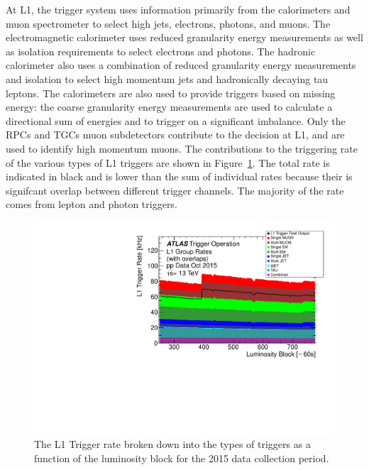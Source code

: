 At L1, the trigger system uses information primarily from the calorimeters and muon spectrometer to select high \pt jets, electrons, photons, and muons. 
The electromagnetic calorimeter uses reduced granularity energy measurements as well as isolation requirements to select electrons and photons.
The hadronic calorimeter also uses a combination of reduced granularity energy measurements and isolation to select high momentum jets and hadronically decaying tau leptons. 
The calorimeters are also used to provide triggers based on missing energy: the coarse granularity energy measurements are used to calculate a directional sum of energies and to trigger on a significant imbalance.
Only the \acp{RPC} and \acp{TGC} muon subdetectors contribute to the decision at L1, and are used to identify high momentum muons.
The contributions to the triggering rate of the various types of L1 triggers are shown in Figure~\ref{fig:trigger_l1rate}. 
The total rate is indicated in black and is lower than the sum of individual rates because their is signifcant overlap between different trigger channels. 
The majority of the rate comes from lepton and photon triggers.

\begin{figure}[hbtp]
\includegraphics[width=\fullfig]{figures/trigger_l1rate.pdf}
\caption{The L1 Trigger rate broken down into the types of triggers as a function of the luminosity block for the 2015 data collection period.}
\label{fig:trigger_l1rate}
\end{figure}

